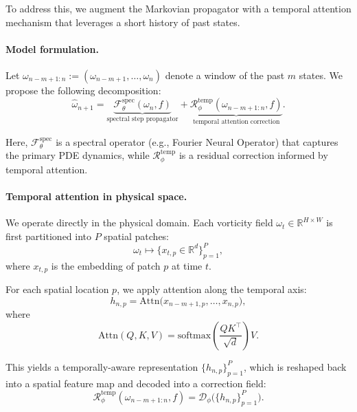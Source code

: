 \documentclass[11pt]{article}
\begin{document}
To address this, we augment the Markovian propagator with a temporal attention mechanism that leverages a short history of past states.

\paragraph{Model formulation.}
Let $\omega_{n-m+1:n} := (\omega_{n-m+1}, \dots, \omega_n)$ denote a window of the past $m$ states. We propose the following decomposition:
\begin{equation}
\widehat{\omega}_{n+1}
=
\underbrace{\mathcal{F}_{\theta}^{\mathrm{spec}}(\omega_n, f)}_{\text{spectral step propagator}}
+
\underbrace{\mathcal{R}_{\phi}^{\mathrm{temp}}(\omega_{n-m+1:n}, f)}_{\text{temporal attention correction}}.
\end{equation}

Here, $\mathcal{F}_{\theta}^{\mathrm{spec}}$ is a spectral operator (e.g., Fourier Neural Operator) that captures the primary PDE dynamics, while $\mathcal{R}_{\phi}^{\mathrm{temp}}$ is a residual correction informed by temporal attention.

\paragraph{Temporal attention in physical space.}
We operate directly in the physical domain. Each vorticity field $\omega_t \in \mathbb{R}^{H \times W}$ is first partitioned into $P$ spatial patches:
\begin{equation}
\omega_t \longmapsto \{ x_{t,p} \in \mathbb{R}^d \}_{p=1}^P,
\end{equation}
where $x_{t,p}$ is the embedding of patch $p$ at time $t$.

For each spatial location $p$, we apply attention along the temporal axis:
\begin{equation}
h_{n,p}
=
\mathrm{Attn}\big(
x_{n-m+1,p}, \dots, x_{n,p}
\big),
\end{equation}
where
\begin{equation}
\mathrm{Attn}(Q,K,V)
=
\mathrm{softmax}\!\left( \frac{QK^\top}{\sqrt{d}} \right)V.
\end{equation}

This yields a temporally-aware representation $\{h_{n,p}\}_{p=1}^P$, which is reshaped back into a spatial feature map and decoded into a correction field:
\begin{equation}
\mathcal{R}_{\phi}^{\mathrm{temp}}(\omega_{n-m+1:n}, f)
=
\mathcal{D}_{\phi}\big( \{h_{n,p}\}_{p=1}^P \big).
\end{equation}
\end{document}
